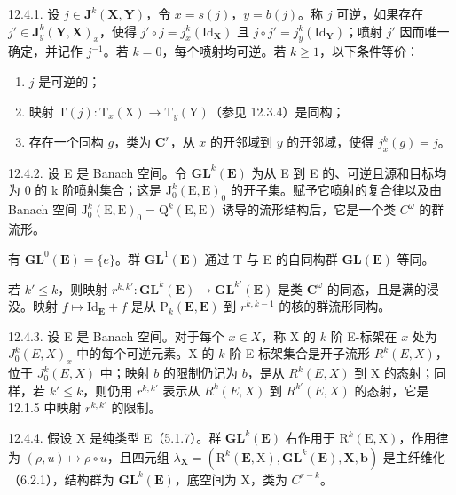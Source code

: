 12.4.1. 设 \(j \in \mathbf{J}^k(\mathbf{X}, \mathbf{Y})\)，令 \(x = s(j)\)，\(y = b(j)\)。称 \(j\) 可逆，如果存在 \(j' \in \mathbf{J}_y^k(\mathbf{Y}, \mathbf{X})_x\)，使得 \(j' \circ j = j_x^k(\mathrm{Id}_{\mathbf{X}})\) 且 \(j \circ j' = j_y^k(\mathrm{Id}_{\mathbf{Y}})\)；喷射 \(j'\) 因而唯一确定，并记作 \(j^{-1}\)。若 \(k = 0\)，每个喷射均可逆。若 \(k \geqslant 1\)，以下条件等价：

\begin{enumerate}
\def\labelenumi{\alph{enumi})}
\item
  \(j\) 是可逆的；
\item
  映射 \(\mathrm{T}(j)\colon\mathrm{T}_{x}(\mathrm{X})\rightarrow\mathrm{T}_{y}(\mathrm{Y})\)（参见 12.3.4）是同构；
\item
  存在一个同构 \(g\)，类为 \(\mathbf{C}^r\)，从 \(x\) 的开邻域到 \(y\) 的开邻域，使得 \(j_x^k(g) = j\)。
\end{enumerate}

12.4.2. 设 E 是 Banach 空间。令 \(\mathbf{GL}^{k}(\mathbf{E})\) 为从 E 到 E 的、可逆且源和目标均为 0 的 k 阶喷射集合；这是 \(\mathrm{J}_{0}^{k}(\mathrm{E},\mathrm{E})_{0}\) 的开子集。赋予它喷射的复合律以及由 Banach 空间 \(\mathrm{J}_{0}^{k}(\mathrm{E},\mathrm{E})_{0}=\mathrm{Q}^{k}(\mathrm{E},\mathrm{E})\) 诱导的流形结构后，它是一个类 \(C^{\omega}\) 的群流形。

有 \(\mathbf{GL}^0 (\mathbf{E}) = \{e\}\)。群 \(\mathbf{GL}^1 (\mathbf{E})\) 通过 T 与 E 的自同构群 \(\mathbf{GL}(\mathbf{E})\) 等同。

若 \(k' \leqslant k\)，则映射 \(r^{k, k'}: \mathbf{GL}^k(\mathbf{E}) \to \mathbf{GL}^{k'}(\mathbf{E})\) 是类 \(\mathbf{C}^\omega\) 的同态，且是满的浸没。映射 \(f \mapsto \mathrm{Id}_{\mathbf{E}} + f\) 是从 \(\mathrm{P}_k(\mathbf{E}, \mathbf{E})\) 到 \(r^{k, k-1}\) 的核的群流形同构。

12.4.3. 设 E 是 Banach 空间。对于每个 \(x \in X\)，称 X 的 \(k\) 阶 E-标架在 \(x\) 处为 \(J_0^k(E, X)_x\) 中的每个可逆元素。X 的 \(k\) 阶 E-标架集合是开子流形 \(R^k(E, X)\)，位于 \(J_0^k(E, X)\) 中；映射 \(b\) 的限制仍记为 \(b\)，是从 \(R^k(E, X)\) 到 X 的态射；同样，若 \(k' \leqslant k\)，则仍用 \(r^{k, k'}\) 表示从 \(R^k(E, X)\) 到 \(R^{k'}(E, X)\) 的态射，它是 12.1.5 中映射 \(r^{k, k'}\) 的限制。

12.4.4. 假设 X 是纯类型 E（5.1.7）。群 \(\mathbf{GL}^{k}(\mathbf{E})\) 右作用于 \(\mathrm{R}^{k}(\mathrm{E},\mathrm{X})\)，作用律为 \((\rho,u)\mapsto\rho\circ u\)，且四元组 \(\lambda_{\mathbf{X}}=(\mathrm{R}^{k}(\mathbf{E},\mathrm{X}),\mathbf{GL}^{k}(\mathbf{E}),\mathbf{X},\mathbf{b})\) 是主纤维化（6.2.1），结构群为 \(\mathbf{GL}^{k}(\mathbf{E})\)，底空间为 X，类为 \(C^{r-k}\)。

